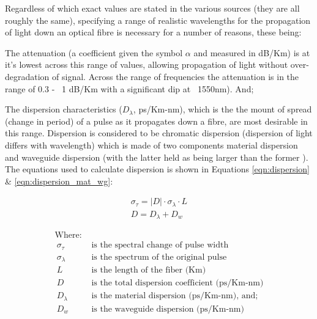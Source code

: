 \documentclass[colorlinks,11pt,a4paper,normalphoto,withhyper,ragged2e]{altareport}
\begin{document}
Regardless of which exact values are stated in the various sources (they are all roughly the same), specifying a range of realistic wavelengths for the propagation of light down an optical fibre is necessary for a number of reasons, these being: \linebreak

The attenuation (a coefficient given the symbol $\alpha$ and measured in dB/Km) is at it's lowest across this range of values, allowing propagation of light without over-degradation of signal. Across the range of frequencies the attenuation is in the range of 0.3 - ~1 dB/Km with a significant dip at ~1550nm). And; \linebreak

The dispersion characteristics ($D_{\lambda}$, ps/Km-nm), which is the the mount of spread (change in period) of a pulse as it propagates down a fibre, are most desirable in this range. 
Dispersion is considered to be chromatic dispersion (dispersion of light differs with wavelength) which is made of two components material dispersion and waveguide dispersion (with the latter held as being larger than the former \cite{fund_of_photonics}). The equations used to calculate dispersion is shown in Equations \ref{eqn:dispersion} \& \ref{eqn:dispersion_mat_wg}:



\begin{paracol}{2}

\medskip

\setlength{\jot}{4ex}
\begin{gather}
	\sigma_{\tau} = \lvert D \rvert \cdot \sigma_{\lambda} \cdot L
	\label{eqn:dispersion}\\
	D = D_{\lambda} + D_{w}
	\label{eqn:dispersion_mat_wg}
\end{gather}

\switchcolumn

\setlength{\jot}{1ex}
\begin{align}
	\text{Where:}& \nonumber\\\
	\sigma_{\tau} & \text{ is the spectral change of pulse width} \nonumber\\\
	\sigma_{\lambda} & \text{ is the spectrum of the original pulse} \nonumber\\\
	L & \text{ is the length of the fiber (Km)} \nonumber\\\
	D & \text{ is the total dispersion coefficient (ps/Km-nm)} \nonumber\\\
	D_{\lambda} & \text{ is the material dispersion (ps/Km-nm), and;} \nonumber\\\
	D_{w} & \text{ is the waveguide dispersion (ps/Km-nm)} \nonumber\
\end{align}


\end{paracol}
\end{document}
